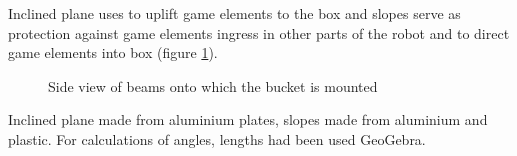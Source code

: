\begin{enumerate}
	  Inclined plane uses to uplift game elements to the box and slopes serve as protection against game elements ingress in other parts of the robot and to direct game elements into 
	  box (figure \ref{Gripper700}).
      \begin{figure}[H]
      	\begin{minipage}[h]{1\linewidth}
      		\caption{Side view of beams onto which the bucket is mounted}
      		\label{Gripper700}
      	\end{minipage}
      \end{figure}
      
      Inclined plane made from aluminium plates, slopes made from aluminium and plastic. For calculations of angles, lengths had been used GeoGebra. %
      

\end{enumerate}
